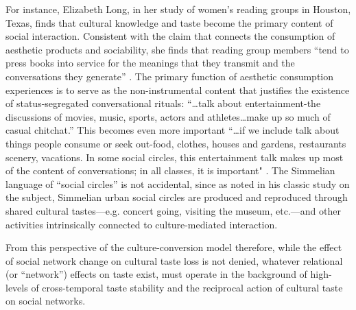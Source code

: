 For instance, Elizabeth Long, in her study of women's reading groups in Houston, Texas, finds that cultural knowledge and taste become the primary content of social interaction. Consistent with the claim that connects the consumption of aesthetic products and sociability, she finds that reading group members ``tend to press books into service for the meanings that they transmit and the conversations they generate'' \citeyearpar[73]{long03}.  The primary function of aesthetic consumption experiences is to serve as the non-instrumental content that justifies the existence of status-segregated conversational rituals: ``{\ldots}talk about entertainment-the discussions of movies, music, sports, actors and athletes…make up so much of casual chitchat.'' This becomes even more important ``{\ldots}if we include talk about things people consume or seek out-food, clothes, houses and gardens, restaurants scenery, vacations. In some social circles, this entertainment talk makes up most of the content of conversations; in all classes, it is important" \citeyearpar[175]{collins75}. The Simmelian language of “social circles” is not accidental, since as \cite[797]{kadushin66} noted in his classic study on the subject, Simmelian urban social circles are produced and reproduced through shared cultural tastes---e.g. concert going, visiting the museum, etc.---and other activities intrinsically connected to culture-mediated interaction. 

From this perspective of the culture-conversion model therefore, while the effect of social network change on cultural taste loss is not denied, whatever relational (or “network”) effects on taste exist, must operate in the background of high-levels of cross-temporal taste stability and the reciprocal action of cultural taste on social networks.

 